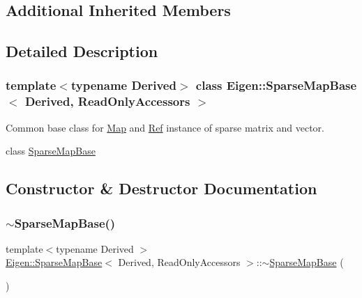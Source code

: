 \subsection*{Additional Inherited Members}


\subsection{Detailed Description}
\subsubsection*{template$<$typename Derived$>$\newline
class Eigen\+::\+Sparse\+Map\+Base$<$ Derived, Read\+Only\+Accessors $>$}

Common base class for \mbox{\hyperlink{class_eigen_1_1_map}{Map}} and \mbox{\hyperlink{class_eigen_1_1_ref}{Ref}} instance of sparse matrix and vector. 

class \mbox{\hyperlink{class_eigen_1_1_sparse_map_base}{Sparse\+Map\+Base}} 

\subsection{Constructor \& Destructor Documentation}
\mbox{\label{class_eigen_1_1_sparse_map_base_3_01_derived_00_01_read_only_accessors_01_4_ab375aedf824909a7f1a6af24ee60d70f}} 
\subsubsection{\texorpdfstring{$\sim$SparseMapBase()}{~SparseMapBase()}}
{\footnotesize\ttfamily template$<$typename Derived $>$ \\
\mbox{\hyperlink{class_eigen_1_1_sparse_map_base}{Eigen\+::\+Sparse\+Map\+Base}}$<$ Derived, Read\+Only\+Accessors $>$\+::$\sim$\mbox{\hyperlink{class_eigen_1_1_sparse_map_base}{Sparse\+Map\+Base}} (\begin{DoxyParamCaption}{ }\end{DoxyParamCaption})\hspace{0.3cm}{\ttfamily [inline]}}

